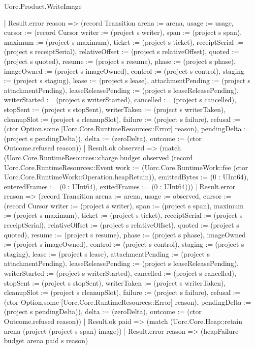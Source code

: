 \begin{lexlean}{Uorc.Product.WriteImage}
\begin{semanticmodule}
{        | Result.error reason => (record Transition {arena := arena, usage := usage, cursor := (record Cursor {writer := (project s writer), span := (project s span), maximum := (project s maximum), ticket := (project s ticket), receiptSerial := (project s receiptSerial), relativeOffset := (project s relativeOffset), quoted := (project s quoted), resume := (project s resume), phase := (project s phase), imageOwned := (project s imageOwned), control := (project s control), staging := (project s staging), lease := (project s lease), attachmentPending := (project s attachmentPending), leaseReleasePending := (project s leaseReleasePending), writerStarted := (project s writerStarted), cancelled := (project s cancelled), stopSent := (project s stopSent), writerTaken := (project s writerTaken), cleanupSlot := (project s cleanupSlot), failure := (project s failure), refusal := (ctor Option.some [Uorc.Core.RuntimeResources::Error] reason), pendingDelta := (project s pendingDelta)}), delta := (zeroDelta), outcome := (ctor Outcome.refused reason)})
        | Result.ok observed => (match (Uorc.Core.RuntimeResources::charge budget observed (record Uorc.Core.RuntimeResources::Event {work := (Uorc.Core.RuntimeWork::fee (ctor Uorc.Core.RuntimeWork::Operation.heapRetain)), emittedBytes := (0 : UInt64), enteredFrames := (0 : UInt64), exitedFrames := (0 : UInt64)}))
          | Result.error reason => (record Transition {arena := arena, usage := observed, cursor := (record Cursor {writer := (project s writer), span := (project s span), maximum := (project s maximum), ticket := (project s ticket), receiptSerial := (project s receiptSerial), relativeOffset := (project s relativeOffset), quoted := (project s quoted), resume := (project s resume), phase := (project s phase), imageOwned := (project s imageOwned), control := (project s control), staging := (project s staging), lease := (project s lease), attachmentPending := (project s attachmentPending), leaseReleasePending := (project s leaseReleasePending), writerStarted := (project s writerStarted), cancelled := (project s cancelled), stopSent := (project s stopSent), writerTaken := (project s writerTaken), cleanupSlot := (project s cleanupSlot), failure := (project s failure), refusal := (ctor Option.some [Uorc.Core.RuntimeResources::Error] reason), pendingDelta := (project s pendingDelta)}), delta := (zeroDelta), outcome := (ctor Outcome.refused reason)})
          | Result.ok paid => (match (Uorc.Core.Heap::retain arena (project (project s span) image))
            | Result.error reason => (heapFailure budget arena paid s reason)
}
\end{semanticmodule}
\end{lexlean}

